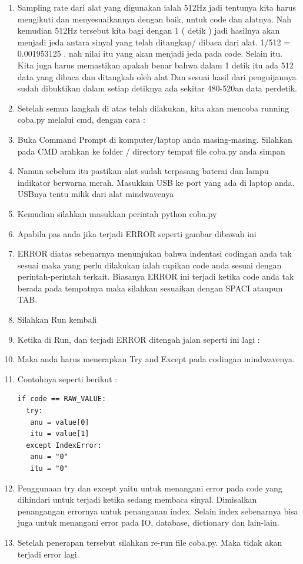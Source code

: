 \begin{enumerate}
\item Sampling rate dari alat yang digunakan ialah 512Hz jadi tentunya kita harus mengikuti dan menyesuaikannya dengan baik, untuk code dan alatnya. Nah kemudian 512Hz tersebut kita bagi dengan 1 ( detik ) jadi hasilnya akan menjadi jeda antara sinyal yang telah ditangkap/ dibaca dari alat. 1/512 = 0.001953125 . nah nilai itu yang akan menjadi jeda pada code.
 Selain itu. Kita juga harus memastikan apakah benar bahwa dalam 1 detik itu ada 512 data yang dibaca dan ditangkah oleh alat Dan sesuai hasil dari penguijannya sudah dibuktikan dalam setiap detiknya ada sekitar 480-520an data perdetik.
\item Setelah semua langkah di atas telah dilakukan, kita akan mencoba running coba.py melalui cmd, dengan cara :
\item Buka Command Prompt di komputer/laptop anda masing-masing. Silahkan pada CMD arahkan ke folder / directory tempat file coba.py anda simpan
\item Namun sebelum itu pastikan alat sudah terpasang baterai dan lampu indikator berwarna merah. Masukkan USB ke port yang ada di laptop anda. USBnya tentu milik dari alat mindwavenya
\item Kemudian silahkan masukkan perintah python coba.py
\item Apabila pas anda jika terjadi ERROR seperti gambar dibawah ini  
\item ERROR diatas sebenarnya menunjukan bahwa indentasi codingan anda tak sesuai maka yang perlu dilakukan ialah rapikan code anda sesuai dengan perintah-perintah terkait. Biasanya ERROR ini terjadi ketika code anda tak berada pada tempatnya maka silahkan sesuaikan dengan SPACI ataupun TAB. 
\item Silahkan Run kembali
\item Ketika di Run, dan terjadi ERROR ditengah jalan seperti ini lagi :
\item Maka anda harus menerapkan Try and Except pada codingan mindwavenya.
\item Contohnya seperti berikut :
\begin{verbatim}
if code == RAW_VALUE:
  try:
   anu = value[0]
   itu = value[1]
  except IndexError:
   anu = "0"
   itu = "0"
\end{verbatim}
\item Penggunaan try dan except yaitu untuk menangani error pada code yang dihindari untuk terjadi ketika sedang membaca sinyal. Dimisalkan penangangan errornya untuk penanganan index. Selain index sebenarnya bisa juga untuk menangani error pada IO, database, dictionary dan lain-lain.
\item Setelah penerapan tersebut silahkan re-run file coba.py. Maka tidak akan terjadi error lagi.
\end{enumerate}

